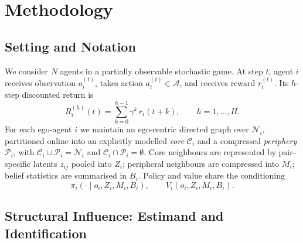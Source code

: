 \documentclass[conference]{IEEEtran}
\begin{document}
\section{Methodology}

\subsection{Setting and Notation}

We consider $N$ agents in a partially observable stochastic game. At step $t$, agent $i$ receives observation $o_i^{(t)}$, takes action $a_i^{(t)}\in\mathcal{A}$, and receives reward $r_i^{(t)}$. Its $h$-step discounted return is
\begin{equation}
R_i^{(h)}(t)=\sum_{k=0}^{h-1}\gamma^{k}\,r_i(t+k), \qquad h=1,\dots,H .
\label{eq:return}
\end{equation}
For each ego-agent $i$ we maintain an ego-centric directed graph over $\mathcal{N}_i$, partitioned online into an explicitly modelled \emph{core} $\mathcal{C}_i$ and a compressed \emph{periphery} $\mathcal{P}_i$, with $\mathcal{C}_i\cup\mathcal{P}_i=\mathcal{N}_i$ and $\mathcal{C}_i\cap\mathcal{P}_i=\emptyset$. Core neighbours are represented by pair-specific latents $z_{ij}$ pooled into $Z_i$; peripheral neighbours are compressed into $M_i$; belief statistics are summarised in $B_i$. Policy and value share the conditioning
\begin{equation}
\pi_i(\cdot\mid o_i,Z_i,M_i,B_i),\qquad V_i(o_i,Z_i,M_i,B_i).
\label{eq:policy}
\end{equation}

\subsection{Structural Influence: Estimand and Identification}
\end{document}

